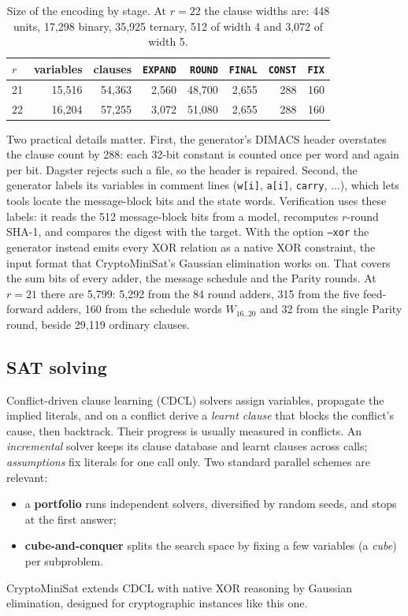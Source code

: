 \documentclass[11pt,a4paper]{article}
\begin{document}
\begin{table}[h]\centering\small
\begin{tabular}{@{}lrrrrrrr@{}}
\toprule
$r$ & \textbf{variables} & \textbf{clauses} & \texttt{EXPAND} & \texttt{ROUND} & \texttt{FINAL} & \texttt{CONST} & \texttt{FIX}\\
\midrule
21 & 15{,}516 & 54{,}363 & 2{,}560 & 48{,}700 & 2{,}655 & 288 & 160\\
22 & 16{,}204 & 57{,}255 & 3{,}072 & 51{,}080 & 2{,}655 & 288 & 160\\
\bottomrule
\end{tabular}
\caption{Size of the encoding by stage. At $r=22$ the clause widths are: 448 units, 17{,}298
binary, 35{,}925 ternary, 512 of width 4 and 3{,}072 of width 5.}
\label{tab:enc}
\end{table}

Two practical details matter. First, the generator's DIMACS header overstates the clause count by
288: each 32-bit constant is counted once per word and again per bit. Dagster rejects such a file,
so the header is repaired. Second, the generator labels its variables in comment lines
(\texttt{w[i]}, \texttt{a[i]}, \texttt{carry}, $\dots$), which lets tools locate the message-block bits and
the state words. Verification uses these labels: it reads the 512 message-block bits from a model,
recomputes $r$-round SHA-1, and compares the digest with the target. With the option
\texttt{--xor} the generator instead emits every XOR relation as a native XOR constraint, the input
format that CryptoMiniSat's Gaussian elimination works on. That covers the sum bits of every adder,
the message schedule and the Parity rounds. At $r=21$ there are 5{,}799: 5{,}292 from the 84 round
adders, 315 from the five feed-forward adders, 160 from the schedule words $W_{16..20}$ and 32 from
the single Parity round, beside 29{,}119 ordinary clauses.

\subsection{SAT solving}

Conflict-driven clause learning (CDCL) solvers \cite{minisat} assign variables, propagate the
implied literals, and on a conflict derive a \emph{learnt clause} that blocks the conflict's cause,
then backtrack. Their progress is usually measured in conflicts. An \emph{incremental} solver keeps
its clause database and learnt clauses across calls; \emph{assumptions} fix literals for one call
only. Two standard parallel schemes are relevant:
\begin{itemize}
\item a \textbf{portfolio} runs independent solvers, diversified by random seeds, and stops at the
first answer;
\item \textbf{cube-and-conquer} splits the search space by fixing a few variables (a \emph{cube})
per subproblem.
\end{itemize}
CryptoMiniSat \cite{cms} extends CDCL with native XOR reasoning by Gaussian elimination, designed for
cryptographic instances like this one.
\end{document}
